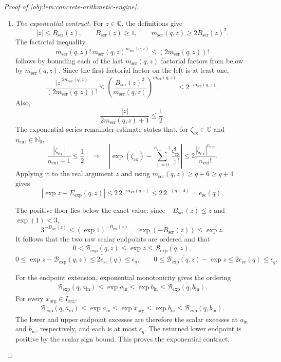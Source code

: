 \documentclass[11pt]{article}
\begin{document}
\begin{proof}[Proof of \cref{obj:lem:concrete-arithmetic-engine}]
\begin{enumerate}
\item \emph{The exponential contract.}
For \(z\in\mathbb Q\), the definitions give
\[
|z|\le B_{\mathrm{ser}}(z),\qquad
B_{\mathrm{ser}}(z)\ge1,\qquad
m_{\mathrm{ser}}(q,z)\ge2B_{\mathrm{ser}}(z)^2.
\]
The factorial inequality
\[
m_{\mathrm{ser}}(q,z)!\,
m_{\mathrm{ser}}(q,z)^{m_{\mathrm{ser}}(q,z)}
 \le(2m_{\mathrm{ser}}(q,z))!
\]
follows by bounding each of the last
\(m_{\mathrm{ser}}(q,z)\) factorial factors from below by
\(m_{\mathrm{ser}}(q,z)\). Since the first factorial factor on the left is at least one,
\[
\frac{|z|^{2m_{\mathrm{ser}}(q,z)}}
     {(2m_{\mathrm{ser}}(q,z))!}
 \le
 \left(\frac{B_{\mathrm{ser}}(z)^2}{m_{\mathrm{ser}}(q,z)}\right)^{
       m_{\mathrm{ser}}(q,z)}
 \le2^{-m_{\mathrm{ser}}(q,z)}.
\]
Also,
\[
\frac{|z|}{2m_{\mathrm{ser}}(q,z)+1}\le\frac12.
\]
The exponential-series remainder estimate states that, for
\(\zeta_{\mathrm{cx}}\in\mathbb C\) and \(n_{\mathrm{cut}}\in\mathbb N_0\),
\[
\frac{|\zeta_{\mathrm{cx}}|}{n_{\mathrm{cut}}+1}\le\frac12
\quad\Longrightarrow\quad
\left|
 \exp(\zeta_{\mathrm{cx}})
 -\sum_{\jmath=0}^{n_{\mathrm{cut}}-1}
       \frac{\zeta_{\mathrm{cx}}^\jmath}{\jmath!}
\right|
 \le2\frac{|\zeta_{\mathrm{cx}}|^{n_{\mathrm{cut}}}}
               {n_{\mathrm{cut}}!}.
\]
Applying it to the real argument \(z\) and using
\(m_{\mathrm{ser}}(q,z)\ge q+6\ge q+4\) gives
\[
|\exp z-\Sigma_{\exp}(q,z)|
 \le2\,2^{-m_{\mathrm{ser}}(q,z)}
 \le2\,2^{-(q+4)}
 =e_{\mathrm{sc}}(q).
\]

The positive floor lies below the exact value: since
\(-B_{\mathrm{ser}}(z)\le z\) and \(\exp(1)<3\),
\[
3^{-B_{\mathrm{ser}}(z)}
 \le(\exp1)^{-B_{\mathrm{ser}}(z)}
 =\exp(-B_{\mathrm{ser}}(z))
 \le\exp z.
\]
It follows that the two raw scalar endpoints are ordered and that
\[
0<\underline{\mathcal B_{\exp}(q,z)}
 \le\exp z\le\overline{\mathcal B_{\exp}(q,z)},
\]
\[
0\le\exp z-\underline{\mathcal B_{\exp}(q,z)}
 \le2e_{\mathrm{sc}}(q)\le\epsilon_q,
\qquad
0\le\overline{\mathcal B_{\exp}(q,z)}-\exp z
 \le2e_{\mathrm{sc}}(q)\le\epsilon_q.
\]

For the endpoint extension, exponential monotonicity gives the ordering
\[
\underline{\mathcal B_{\exp}(q,a_{\mathrm{in}})}
 \le\exp a_{\mathrm{in}}
 \le\exp b_{\mathrm{in}}
 \le\overline{\mathcal B_{\exp}(q,b_{\mathrm{in}})}.
\]
For every \(x_{\mathrm{arg}}\in I_{\mathrm{arg}}\),
\[
\underline{\mathcal B_{\exp}(q,a_{\mathrm{in}})}
 \le\exp a_{\mathrm{in}}
 \le\exp x_{\mathrm{arg}}
 \le\exp b_{\mathrm{in}}
 \le\overline{\mathcal B_{\exp}(q,b_{\mathrm{in}})}.
\]
The lower and upper endpoint excesses are therefore the scalar excesses at
\(a_{\mathrm{in}}\) and \(b_{\mathrm{in}}\), respectively, and each is at most
\(\epsilon_q\). The returned lower endpoint is positive by the scalar sign bound. This proves the exponential contract.


\end{enumerate}
\end{proof}
\end{document}

